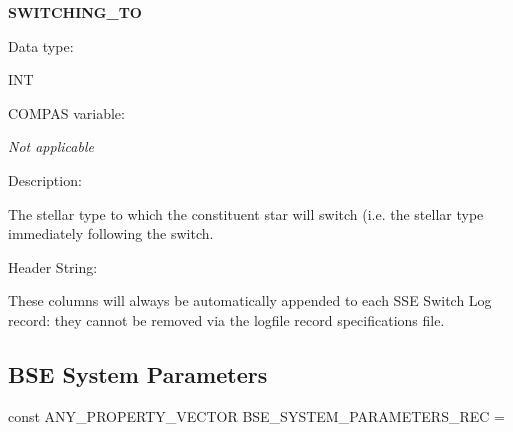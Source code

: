 \medskip
\begin{minipage}{\textwidth} %
    \textbf{SWITCHING\_TO} \\
    \parskip 0pt
    \begin{minipage}[t][][b]{8.25em}Data type:\end{minipage}
    \begin{minipage}[t][][b]{\dimexpr\textwidth-8.75em}INT\end{minipage}\vfill
    \begin{minipage}[t][][b]{8.25em}COMPAS variable:\end{minipage}
    \begin{minipage}[t][][b]{\dimexpr\textwidth-8.75em}\textit{Not applicable}\end{minipage}\vfill
    \begin{minipage}[t][][b]{8.25em}Description:\end{minipage}
    \begin{minipage}[t][][b]{\dimexpr\textwidth-8.75em}\raggedright{The stellar type to which the constituent star will switch (i.e. the stellar type immediately following the switch.}\end{minipage}\vfill
    \begin{minipage}[t][][b]{8.25em}Header String:\end{minipage}
    \begin{minipage}[t][][b]{\dimexpr\textwidth-8.75em}\raggedright{}\end{minipage}\vfill
\end{minipage}

\bigskip
These columns will always be automatically appended to each SSE Switch Log record: they cannot be removed via the logfile record specifications file.

\newpage
\subsection{BSE System Parameters}\label{sec:BSESystemParameters}

const ANY\_PROPERTY\_VECTOR BSE\_SYSTEM\_PARAMETERS\_REC = \lcb

